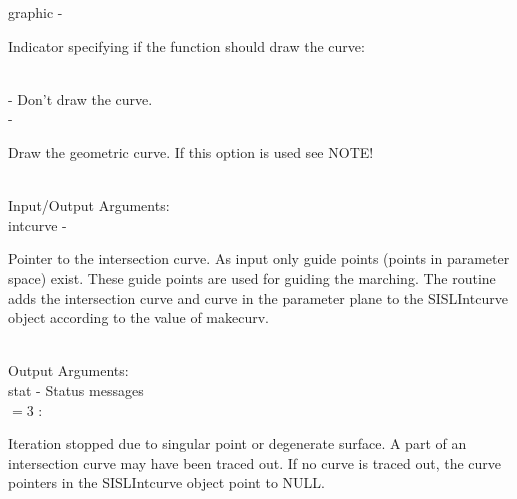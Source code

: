         \>\>    {\fov graphic}\> - \>   \begin{minipg2}
                                Indicator specifying if the function
                                should draw the curve:
                                \end{minipg2}\\
                \>\>\>\> -     \>Don't draw the curve.\\
                \>\>\>\> -     \>\begin{minipg5}
                                        Draw the geometric curve. If this option
                                        is used see NOTE!
                                        \end{minipg5} \\[0.8ex]
        \>Input/Output Arguments:\\
        \>\>    {\fov intcurve}\> - \>  \begin{minipg2}
                                Pointer to the intersection curve.
                                As input only
                                guide points (points in parameter space)
                                exist. These guide points
                                are used for guiding the marching.
                                The routine adds the
                                intersection curve and curve in the parameter
                                plane to the SISLIntcurve object according to the value
                                of makecurv.
                                \end{minipg2}\\[0.8ex]
        \>Output Arguments:\\
        \>\>    {\fov stat}     \> - \> Status messages\\
                \>\>\>\>\>      $= 3$ : \>      \begin{minipg5}
                                                Iteration stopped due to singular
                                                point or degenerate surface. A part of
                                                an intersection curve may have been
                                                traced out. If no curve is traced out,
                                                the curve pointers in the SISLIntcurve
                                                object point to NULL.
                                                \end{minipg5} \\[0.3ex]
